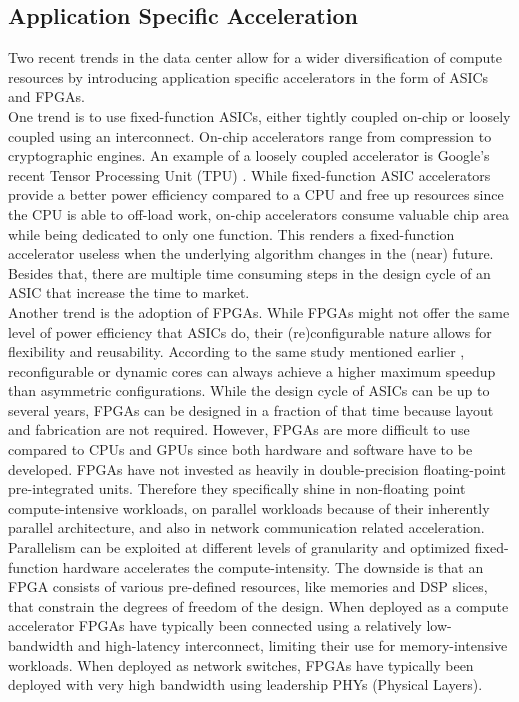 \subsection{Application Specific Acceleration}
Two recent trends in the data center allow for a wider diversification of compute resources by introducing application specific accelerators in the form of ASICs and FPGAs.\\
One trend is to use fixed-function ASICs, either tightly coupled on-chip or loosely coupled using an interconnect. On-chip accelerators range from compression to cryptographic engines. An example of a loosely coupled accelerator is Google's recent Tensor Processing Unit (TPU) \cite{tpu}. While fixed-function ASIC accelerators provide a better power efficiency compared to a CPU and free up resources since the CPU is able to off-load work, on-chip accelerators consume valuable chip area while being dedicated to only one function. This renders a fixed-function accelerator useless when the underlying algorithm changes in the (near) future. Besides that, there are multiple time consuming steps in the design cycle of an ASIC that increase the time to market.\\
Another trend is the adoption of FPGAs. While FPGAs might not offer the same level of power efficiency that ASICs do, their (re)configurable nature allows for flexibility and reusability. According to the same study mentioned earlier \cite{amdahl-era}, reconfigurable or dynamic cores can always achieve a higher maximum speedup than asymmetric configurations. While the design cycle of ASICs can be up to several years, FPGAs can be designed in a fraction of that time because layout and fabrication are not required. However, FPGAs are more difficult to use compared to CPUs and GPUs since both hardware and software have to be developed. FPGAs have not invested as heavily in double-precision floating-point pre-integrated units. Therefore they specifically shine in non-floating point compute-intensive workloads, on parallel workloads because of their inherently parallel architecture, and also in network communication related acceleration. Parallelism can be exploited at different levels of granularity and optimized fixed-function hardware accelerates the compute-intensity. %
The downside is that an FPGA consists of various pre-defined resources, like memories and DSP slices, that constrain the degrees of freedom of the design. When deployed as a compute accelerator FPGAs have typically been connected using a relatively low-bandwidth and high-latency interconnect, limiting their use for memory-intensive workloads. When deployed as network switches, FPGAs have typically been deployed with very high bandwidth using leadership PHYs (Physical Layers).





